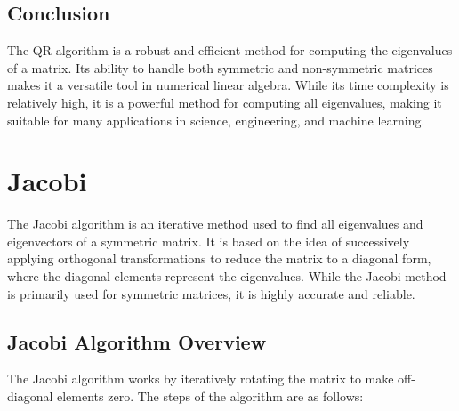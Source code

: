 \documentclass[journal]{IEEEtran}
\begin{document}
\subsection{Conclusion}
The QR algorithm is a robust and efficient method for computing the eigenvalues of a matrix. Its ability to handle both symmetric and non-symmetric matrices makes it a versatile tool in numerical linear algebra. While its time complexity is relatively high, it is a powerful method for computing all eigenvalues, making it suitable for many applications in science, engineering, and machine learning.

\section{\textbf{Jacobi}}
The Jacobi algorithm is an iterative method used to find all eigenvalues and eigenvectors of a symmetric matrix. It is based on the idea of successively applying orthogonal transformations to reduce the matrix to a diagonal form, where the diagonal elements represent the eigenvalues. While the Jacobi method is primarily used for symmetric matrices, it is highly accurate and reliable.

\subsection{Jacobi Algorithm Overview}
The Jacobi algorithm works by iteratively rotating the matrix to make off-diagonal elements zero. The steps of the algorithm are as follows:
\end{document}
